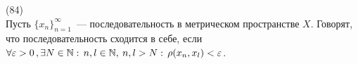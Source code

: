 (84)\\
Пусть $\{x_n\}^\infty_{n = 1}$~--- последовательность в метрическом пространстве $X$. Говорят, что последовательность сходится в себе, если $\forall \varepsilon > 0\,, \exists N \in \mathbb{N}:\,n, l \in \mathbb{N},\: n, l > N:\, \rho(x_n, x_l) < \varepsilon$.\\